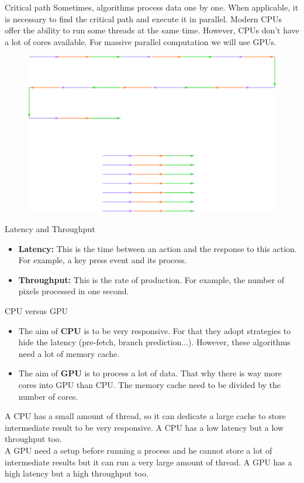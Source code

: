\documentclass{beamer}
\begin{document}
\begin{frame}{Critical path}
	Sometimes, algorithms process data one by one. When applicable, it is necessary to find the critical path and execute it in parallel. Modern CPUs offer the ability to run some threads at the same time. However, CPUs don't have a lot of cores available. For massive parallel computation we will use GPUs.
	\begin{figure}
		\includegraphics[scale=0.2]{figures/criticalPath.pdf}
	\end{figure}
\end{frame}

\begin{frame}{Latency and Throughput}
	\begin{itemize}
		\item \textbf{Latency:} This is the time between an action and the response to this action. For example, a key press event and its process.
		\item \textbf{Throughput:} This is the rate of production. For example, the number of pixels processed in one second.
	\end{itemize}
\end{frame}

\begin{frame}{CPU versus GPU}
	\begin{itemize}
		\item The aim of \textbf{CPU} is to be very responsive. For that they adopt strategies to hide the latency (pre-fetch, branch prediction...). However, these algorithms need a lot of memory cache.
		\item The aim of \textbf{GPU} is to process a lot of data. That why there is way more cores into GPU than CPU. The memory cache need to be divided by the number of cores.
	\end{itemize}
	A CPU has a small amount of thread, so it can dedicate a large cache to store intermediate result to be very responsive. A CPU has a low latency but a low throughput too.\\
	A GPU need a setup before running a process and he cannot store a lot of intermediate results but it can run a very large amount of thread. A GPU has a high latency but a high throughput too.
\end{frame}
\end{document}
